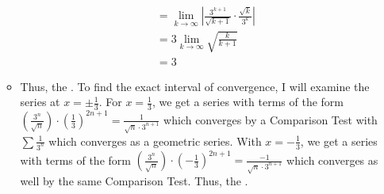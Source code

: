 \documentclass[10pt,a4paper]{article}
\theoremstyle{definition}
\begin{document}
\begin{enumerate}[label = (\alph*)]
\begin{itemize}
\begin{align*}
	&= \lim_{k \to \infty} \left|\frac{3^{k+1}}{\sqrt{k+1}} \cdot \frac{\sqrt{k}}{3^k}\right|\\
	&= 3 \lim_{k \to \infty} \sqrt{\frac{k}{k + 1}}\\
	&= 3
	\end{align*}
	\item Thus, the . To find the exact interval of convergence, I will examine the series at $x = \pm \frac{1}{3}$. For $x = \frac{1}{3}$, we get a series with terms of the form $\displaystyle \left(\frac{3^n}{\sqrt{n}}\right)\cdot \left(\frac{1}{3}\right)^{2n + 1} = \frac{1}{\sqrt{n}\cdot 3^{n+1}}$ which converges by a Comparison Test with $\sum \frac{1}{3^n}$ which converges as a geometric series. With $x = -\frac{1}{3}$, we get a series with terms of the form $\displaystyle \left(\frac{3^n}{\sqrt{n}}\right)\cdot \left(-\frac{1}{3}\right)^{2n + 1} = \frac{-1}{\sqrt{n}\cdot 3^{n+1}}$ which converges as well by the same Comparison Test. Thus, the .
	\end{itemize}
\end{enumerate}
\end{document}
